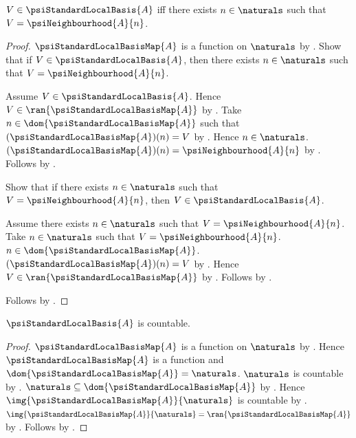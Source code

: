 \begin{proposition}\label{psi_standard_local_basis_members}
    $V\in\psiStandardLocalBasis{A}$ iff there exists $n\in\naturals$
        such that $V=\psiNeighbourhood{A}{n}$.
\end{proposition}
\begin{proof}
    $\psiStandardLocalBasisMap{A}$ is a function on $\naturals$
        by .
    Show that if $V\in\psiStandardLocalBasis{A}$, then there exists
        $n\in\naturals$ such that $V=\psiNeighbourhood{A}{n}$.
    \begin{subproof}
        Assume $V\in\psiStandardLocalBasis{A}$.
        Hence $V\in\ran{\psiStandardLocalBasisMap{A}}$
            by .
        Take $n\in\dom{\psiStandardLocalBasisMap{A}}$ such that
            $(\psiStandardLocalBasisMap{A})(n)=V$
            by .
        Hence $n\in\naturals$.
        $(\psiStandardLocalBasisMap{A})(n)=
            \psiNeighbourhood{A}{n}$ by
            .
        Follows by \auto.
    \end{subproof}
    Show that if there exists $n\in\naturals$ such that
        $V=\psiNeighbourhood{A}{n}$, then
        $V\in\psiStandardLocalBasis{A}$.
    \begin{subproof}
        Assume there exists $n\in\naturals$ such that
            $V=\psiNeighbourhood{A}{n}$.
        Take $n\in\naturals$ such that
            $V=\psiNeighbourhood{A}{n}$.
        $n\in\dom{\psiStandardLocalBasisMap{A}}$.
        $(\psiStandardLocalBasisMap{A})(n)=V$ by
            .
        Hence $V\in\ran{\psiStandardLocalBasisMap{A}}$
            by .
        Follows by .
    \end{subproof}
    Follows by \auto.
\end{proof}

\begin{theorem}\label{psi_standard_local_basis_is_countable}
    $\psiStandardLocalBasis{A}$ is countable.
\end{theorem}
\begin{proof}
    $\psiStandardLocalBasisMap{A}$ is a function on $\naturals$
        by .
    Hence $\psiStandardLocalBasisMap{A}$ is a function and
        $\dom{\psiStandardLocalBasisMap{A}}=\naturals$.
    $\naturals$ is countable by .
    $\naturals\subseteq\dom{\psiStandardLocalBasisMap{A}}$
        by .
    Hence $\img{\psiStandardLocalBasisMap{A}}{\naturals}$ is countable
        by .
    $\img{\psiStandardLocalBasisMap{A}}{\naturals}=
        \ran{\psiStandardLocalBasisMap{A}}$ by .
    Follows by .
\end{proof}

